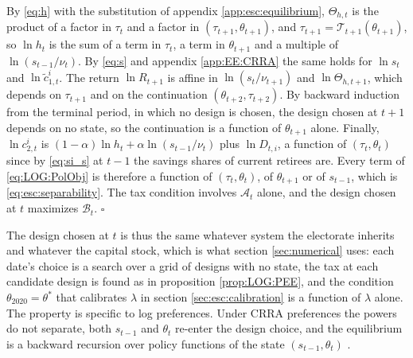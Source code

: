  By \eqref{eq:h} with the substitution of appendix \ref{app:esc:equilibrium}, $\Theta_{h,t}$ is the product of a factor in $\tau_t$ and a factor in $(\tau_{t+1},\theta_{t+1})$, and $\tau_{t+1} = \mathcal{T}_{t+1}(\theta_{t+1})$, so $\ln h_t$ is the sum of a term in $\tau_t$, a term in $\theta_{t+1}$ and a multiple of $\ln(s_{t-1}/\nu_t)$. By \eqref{eq:s} and appendix \ref{app:EE:CRRA} the same holds for $\ln s_t$ and $\ln\tilde{c}_{1,t}^i$. The return $\ln R_{t+1}$ is affine in $\ln(s_t/\nu_{t+1})$ and $\ln\Theta_{h,t+1}$, which depends on $\tau_{t+1}$ and on the continuation $(\theta_{t+2},\tau_{t+2})$. By backward induction from the terminal period, in which no design is chosen, the design chosen at $t+1$ depends on no state, so the continuation is a function of $\theta_{t+1}$ alone. Finally, $\ln c_{2,t}^i$ is $(1-\alpha)\ln h_t+\alpha\ln(s_{t-1}/\nu_t)$ plus $\ln D_{t,i}$, a function of $(\tau_t,\theta_t)$ since by \eqref{eq:si_s} at $t-1$ the savings shares of current retirees are. Every term of \eqref{eq:LOG:PolObj} is therefore a function of $(\tau_t,\theta_t)$, of $\theta_{t+1}$ or of $s_{t-1}$, which is \eqref{eq:esc:separability}. The tax condition involves $\mathcal{A}_t$ alone, and the design chosen at $t$ maximizes $\mathcal{B}_t$. $\square$

\bigskip
The design chosen at $t$ is thus the same whatever system the electorate inherits and whatever the capital stock, which is what section \ref{sec:numerical} uses: each date's choice is a search over a grid of designs with no state, the tax at each candidate design is found as in proposition \ref{prop:LOG:PEE}, and the condition $\theta_{2020} = \theta^{\ast}$ that calibrates $\lambda$ in section \ref{sec:esc:calibration} is a function of $\lambda$ alone. The property is specific to log preferences. Under CRRA preferences the powers do not separate, both $s_{t-1}$ and $\theta_t$ re-enter the design choice, and the equilibrium is a backward recursion over policy functions of the state $(s_{t-1},\theta_t)$ \parencite{BergGE26doc}.

